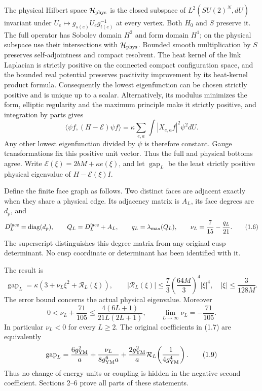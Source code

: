 \documentclass[
  11pt,
]{article}
\begin{document}
The physical Hilbert space \(\mathcal H_{\rm phys}\) is the closed
subspace of \(L^2(SU(2)^N,dU)\) invariant under
\(U_e\mapsto g_{s(e)}U_eg_{t(e)}^{-1}\) at every vertex. Both \(H_0\)
and \(S\) preserve it. The full operator has Sobolev domain \(H^2\) and
form domain \(H^1\); on the physical subspace use their intersections
with \(\mathcal H_{\rm phys}\). Bounded smooth multiplication by \(S\)
preserves self-adjointness and compact resolvent. The heat kernel of the
link Laplacian is strictly positive on the connected compact
configuration space, and the bounded real potential preserves positivity
improvement by its heat-kernel product formula. Consequently the lowest
eigenfunction can be chosen strictly positive and is unique up to a
scalar. Alternatively, its modulus minimizes the form, elliptic
regularity and the maximum principle make it strictly positive, and
integration by parts gives \[
 \langle\psi f,(H-\mathcal E)\psi f\rangle
   =\kappa\sum_{e,a}\int|X_{e,a}f|^2\psi^2dU.
\tag{1.5}
\] Any other lowest eigenfunction divided by \(\psi\) is therefore
constant. Gauge transformations fix this positive unit vector. Thus the
full and physical bottoms agree. Write
\(\mathcal E(\xi)=2bM+\kappa e(\xi)\), and let \(\operatorname{gap}_L\)
be the least strictly positive physical eigenvalue of
\(H-\mathcal E(\xi)I\).

Define the finite face graph as follows. Two distinct faces are adjacent
exactly when they share a physical edge. Its adjacency matrix is
\(A_L\), its face degrees are \(d_p\), and \[
 D_L^{\rm face}=\operatorname{diag}(d_p),\qquad
 Q_L=D_L^{\rm face}+A_L,\qquad q_L=\lambda_{\max}(Q_L),\qquad
 \nu_L=\frac7{15}-\frac{q_L}{21}.
\tag{1.6}
\] The superscript distinguishes this degree matrix from any original
cusp determinant. No cusp coordinate or determinant has been identified
with it.

The result is \[
 \boxed{\operatorname{gap}_L
   =\kappa\left(3+\nu_L\xi^2+\mathcal R_L(\xi)\right),\qquad
 |\mathcal R_L(\xi)|\leq
 \frac73\left(\frac{64M}{3}\right)^4|\xi|^4,
 \quad |\xi|\leq\frac{3}{128M}.}
\tag{1.7}
\] The error bound concerns the actual physical eigenvalue. Moreover \[
 \boxed{0<\nu_L+\frac{71}{105}
       \leq\frac{4(6L+1)}{21L(2L+1)},\qquad
       \lim_{L\to\infty}\nu_L=-\frac{71}{105}.}
\tag{1.8}
\] In particular \(\nu_L<0\) for every \(L\geq2\). The original
coefficients in (1.7) are equivalently \[
 \operatorname{gap}_L=
 \frac{6g_{\rm YM}^2}{a}
 +\frac{\nu_L}{8g_{\rm YM}^6a}
 +\frac{2g_{\rm YM}^2}{a}\mathcal R_L\!\left(\frac1{4g_{\rm YM}^4}\right).
\tag{1.9}
\] Thus no change of energy units or coupling is hidden in the negative
second coefficient. Sections 2--6 prove all parts of these statements.
\end{document}
